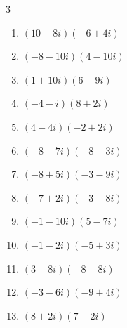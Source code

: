 \begin{multicols}{3}
\begin{enumerate}
        \phantom{$\displaystyle =143+34i$}

  \item $\displaystyle (10-8i)(-6+4i)$

        \phantom{$\displaystyle =-28+88i$}

  \item $\displaystyle (-8-10i)(4-10i)$

        \phantom{$\displaystyle =-132+40i$}

\columnbreak %

  \item $\displaystyle (1+10i)(6-9i)$

        \phantom{$\displaystyle =96+51i$}

  \item $\displaystyle (-4-i)(8+2i)$

        \phantom{$\displaystyle =-30-16i$}

  \item $\displaystyle (4-4i)(-2+2i)$

        \phantom{$\displaystyle =16i$}

  \item $\displaystyle (-8-7i)(-8-3i)$

        \phantom{$\displaystyle =43+80i$}

  \item $\displaystyle (-8+5i)(-3-9i)$

        \phantom{$\displaystyle =69+57i$}

  \item $\displaystyle (-7+2i)(-3-8i)$

        \phantom{$\displaystyle =37+50i$}

  \item $\displaystyle (-1-10i)(5-7i)$

        \phantom{$\displaystyle =-75-43i$}

  \item $\displaystyle (-1-2i)(-5+3i)$

        \phantom{$\displaystyle =11+7i$}

  \item $\displaystyle (3-8i)(-8-8i)$

        \phantom{$\displaystyle =-88+40i$}

  \item $\displaystyle (-3-6i)(-9+4i)$

        \phantom{$\displaystyle =51+42i$}

  \item $\displaystyle (8+2i)(7-2i)$


\end{enumerate}
\end{multicols}

